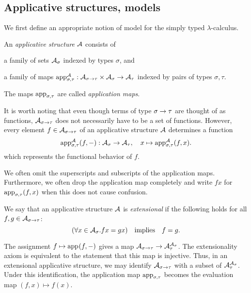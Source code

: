 \subsection{Applicative structures, models} \label{sec:models}

We first define an appropriate notion of model for the simply typed $\lambda$-calculus.

\begin{defn}
An \emph{applicative structure} $\mathcal{A}$ consists of
\begin{items}
    \item a family of sets $\mathcal{A}_{\sigma}$ indexed by types $\sigma$, and
    \item a family of maps $\sapp[\sigma,\tau][\struct{A}] : \cartprod{\scomp{\struct{A}}{\functy{\sigma}{\tau}}}{\scomp{\struct{A}}{\sigma}} \to \scomp{\struct{A}}{\tau}$ indexed by pairs of types $\sigma, \tau$.
\end{items}
The maps $\sapp[\sigma, \tau]$ are called \emph{application maps}.
\end{defn}

It is worth noting that even though terms of type $\sigma \to \tau$ are thought of as functions, $\mathcal{A}_{\sigma \to \tau}$ does not necessarily have to be a set of functions. However, every element $f \in \mathcal{A}_{\sigma \to \tau}$ of an applicative structure $\mathcal{A}$ determines a function
\[ \sapp[\sigma,\tau][\struct{A}](f, -) : \scomp{\struct{A}}{\sigma} \to \scomp{\struct{A}}{\tau}, \quad
    x \mapsto \sapp[\sigma,\tau][\struct{A}](f, x). \]
which represents the functional behavior of $f$.

\begin{notn}
We often omit the superscripts and subscripts of the application maps. Furthermore, we often drop the application map completely and write $fx$ for $\sapp[\sigma,\tau](f, x)$ when this does not cause confusion.
\end{notn}

\begin{defn} \label{def:ext-app-struct}
We say that an applicative structure $\mathcal{A}$ is \emph{extensional} if the following holds for all $f, g \in \mathcal{A}_{\sigma \to \tau}$:
\[ (\forall x \in \mathcal{A}_{\sigma}. fx = gx) \quad\text{implies}\quad f = g. \]
\end{defn}

\begin{rem} \label{rem:ext-app-struct}
The assignment $f \mapsto \sapp(f, -)$ gives a map $\mathcal{A}_{\sigma \to \tau} \to \mathcal{A}_{\tau}^{\mathcal{A}_{\sigma}}$. The extensionality axiom is equivalent to the statement that this map is injective. Thus, in an extensional applicative structure, we may identify $\mathcal{A}_{\sigma \to \tau}$ with a subset of $\mathcal{A}_{\tau}^{\mathcal{A}_{\sigma}}$. Under this identification, the application map $\sapp[\sigma,\tau]$ becomes the evaluation map $(f, x) \mapsto f(x)$.
\end{rem}

